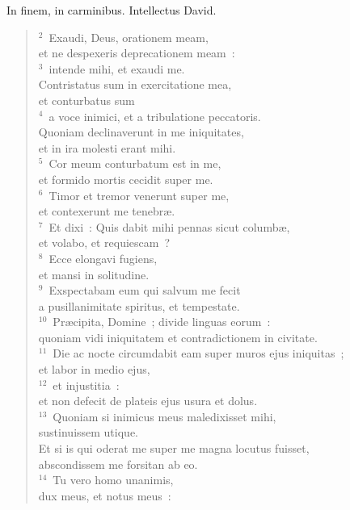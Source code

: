 \bchapter
\lettrine[lines=3,image=true,loversize=0.05,lraise=-0.03]{I}{}n finem, in carminibus. Intellectus David.
\begin{flushleft}\begin{verse}\vspace{6pt}${}^{2}$~Exaudi, Deus, orationem meam,\\ et ne despexeris deprecationem meam~:\\
${}^{3}$~intende mihi, et exaudi me.\\ Contristatus sum in exercitatione mea,\\ et conturbatus sum\\
${}^{4}$~a voce inimici, et a tribulatione peccatoris.\\ Quoniam declinaverunt in me iniquitates,\\ et in ira molesti erant mihi.\\
${}^{5}$~Cor meum conturbatum est in me,\\ et formido mortis cecidit super me.\\
${}^{6}$~Timor et tremor venerunt super me,\\ et contexerunt me tenebr\ae .\\
${}^{7}$~Et dixi~: Quis dabit mihi pennas sicut columb\ae ,\\ et volabo, et requiescam~?\\
${}^{8}$~Ecce elongavi fugiens,\\ et mansi in solitudine.\\
${}^{9}$~Exspectabam eum qui salvum me fecit\\ a pusillanimitate spiritus, et tempestate.\\
${}^{10}$~Pr\ae cipita, Domine~; divide linguas eorum~:\\ quoniam vidi iniquitatem et contradictionem in civitate.\\
${}^{11}$~Die ac nocte circumdabit eam super muros ejus iniquitas~;\\ et labor in medio ejus,\\
${}^{12}$~et injustitia~:\\ et non defecit de plateis ejus usura et dolus.\\
${}^{13}$~Quoniam si inimicus meus maledixisset mihi,\\ sustinuissem utique.\\ Et si is qui oderat me super me magna locutus fuisset,\\ abscondissem me forsitan ab eo.\\
${}^{14}$~Tu vero homo unanimis,\\ dux meus, et notus meus~:\\

\end{verse}
\end{flushleft}
